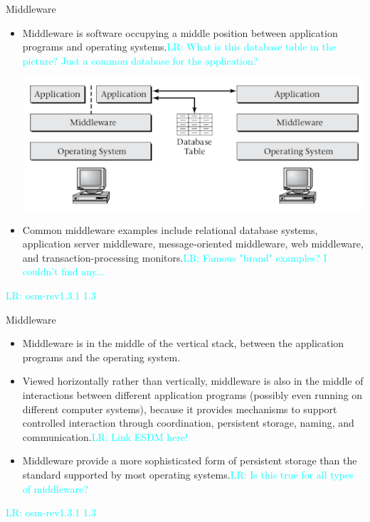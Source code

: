 \documentclass[compress,11pt,xcolor=svgnames,aspectratio=169]{beamer}
\newcommand{\lr}[1]{\textcolor{cyan}{LR: #1}}
\begin{document}
\begin{frame}[t]{Middleware}

\begin{itemize}
\setlength\itemsep{0.4cm}

  \item Middleware is software occupying a middle position between application programs and operating systems.\lr{What is this database table in the picture? Just a common database for the application?}

  \begin{center}
  \includegraphics[scale=0.5]{fig/middleware}
  \end{center}

  \item Common middleware examples include relational database systems, application server middleware, message-oriented middleware, web middleware, and transaction-processing monitors.\lr{Famous "brand" examples? I couldn't find any...}

\end{itemize}

\lr{osm-rev1.3.1 1.3}

\end{frame}

\begin{frame}[t]{Middleware}

\begin{itemize}
\setlength\itemsep{0.6cm}

  \item Middleware is in the middle of the vertical stack, between the application programs and the operating system.

  \item Viewed horizontally rather than vertically, middleware is also in the middle of interactions between different application programs (possibly even running on different computer systems), because it provides mechanisms to support controlled interaction through coordination, persistent storage, naming, and communication.\lr{Link ESDM here!}

  \item Middleware provide a more sophisticated form of persistent storage than the standard supported by most operating systems.\lr{Is this true for all types of middleware?}

\end{itemize}

\lr{osm-rev1.3.1 1.3}

\end{frame}
\end{document}
